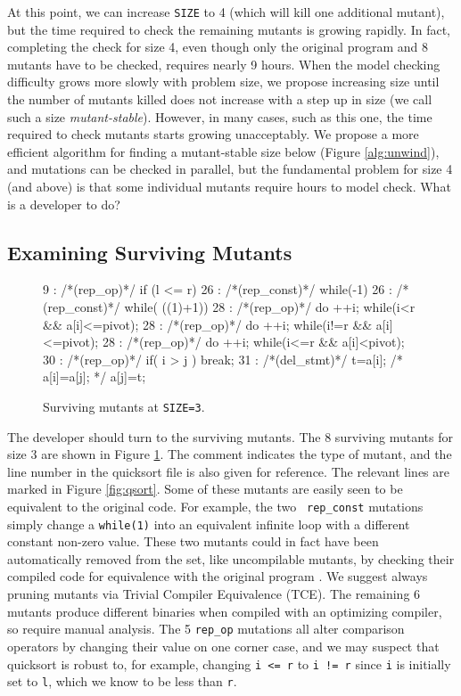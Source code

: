 \documentclass[conference]{IEEEtran}
\begin{document}
At this point, we can increase {\tt SIZE} to 4 (which will kill one
additional mutant), but the time required to check the remaining
mutants is growing rapidly.  In fact, completing the check for size 4,
even though only the original program and 8 mutants have to be
checked, requires nearly 9 hours.  When the model checking
difficulty grows more slowly with problem size, we propose increasing
size until the number of mutants killed does not increase with a step
up in size (we call such a size \emph{mutant-stable}).  However, in
many cases, such as this one, the time required to check mutants
starts growing unacceptably.  We propose a more efficient algorithm
for finding a mutant-stable size below (Figure \ref{alg:unwind}), and
mutations can be checked in parallel, but the fundamental problem for
size 4 (and above) is that some individual mutants require hours to
model check.  What is a developer to do?


\subsection{Examining Surviving Mutants}
\label{sec:maxcover}


\begin{figure}
{\scriptsize
\begin{code}
 9 :   /*(rep\_op)*/ if (l <= r) 
 26 :  /*(rep\_const)*/ while(-1)
 26 :  /*(rep\_const)*/ while( ((1)+1))
 28 :  /*(rep\_op)*/ do ++i; while(i<r \&\& a[i]<=pivot);
 28 :  /*(rep\_op)*/ do ++i; while(i!=r \&\& a[i]<=pivot);
 28 :  /*(rep\_op)*/ do ++i; while(i<=r \&\& a[i]<pivot);
 30 :  /*(rep\_op)*/ if( i > j ) break;
 31 :  /*(del\_stmt)*/ t=a[i]; /*  a[i]=a[j]; */  a[j]=t;
\end{code}
}
\caption{Surviving mutants at {\tt SIZE=3}.}
\label{fig:survivors}
\end{figure}

The developer should turn to the surviving mutants.  The 8 surviving  
mutants for size 3 are shown in Figure \ref{fig:survivors}.  
The comment indicates the type of mutant, and the line number in the quicksort file is also given for reference.  The relevant lines are marked
in Figure \ref{fig:qsort}.  Some of these mutants are easily seen to
be equivalent to the original code.  For example, the two {\tt
  rep\_const} mutations simply change a {\tt while(1)} into an
equivalent infinite loop with a different constant non-zero value.
These two mutants could in fact have been automatically removed from
the set, like uncompilable mutants, by checking their compiled code
for equivalence with the original program \cite{TCE}.  We suggest
always pruning mutants via Trivial Compiler Equivalence (TCE).  The remaining 6 mutants produce different
binaries when compiled with an optimizing compiler, so require manual
analysis.  The 5 {\tt rep\_op} mutations all alter comparison
operators by changing their value on one corner case, and we may suspect that quicksort is robust to,
for example, changing {\tt i <= r} to {\tt i != r} since {\tt i} is
initially set to {\tt l}, which we know to be less than {\tt r}.
\end{document}
